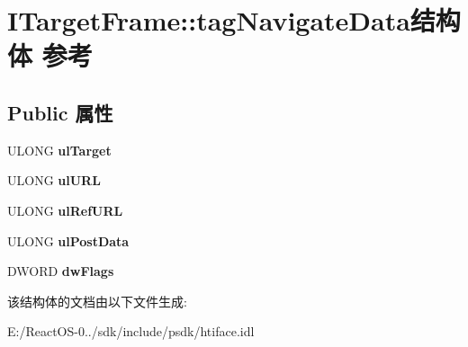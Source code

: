 \hypertarget{struct_i_target_frame_1_1tag_navigate_data}{}\section{I\+Target\+Frame\+:\+:tag\+Navigate\+Data结构体 参考}
\label{struct_i_target_frame_1_1tag_navigate_data}
\subsection*{Public 属性}
\begin{DoxyCompactItemize}
\item 
\mbox{\label{struct_i_target_frame_1_1tag_navigate_data_a6bf30644d53265e6566ba559ad3ac467}} 
U\+L\+O\+NG {\bfseries ul\+Target}
\item 
\mbox{\label{struct_i_target_frame_1_1tag_navigate_data_a969f78fed65c13a7c125ab4b8efbfa29}} 
U\+L\+O\+NG {\bfseries ul\+U\+RL}
\item 
\mbox{\label{struct_i_target_frame_1_1tag_navigate_data_adc81b193279c91fb4442cb2fde2ea7e4}} 
U\+L\+O\+NG {\bfseries ul\+Ref\+U\+RL}
\item 
\mbox{\label{struct_i_target_frame_1_1tag_navigate_data_a370b46f4957dd6625ee2cb2afd8da9c5}} 
U\+L\+O\+NG {\bfseries ul\+Post\+Data}
\item 
\mbox{\label{struct_i_target_frame_1_1tag_navigate_data_adb2deaeae96aa7bbedd604989c7b4b62}} 
D\+W\+O\+RD {\bfseries dw\+Flags}
\end{DoxyCompactItemize}


该结构体的文档由以下文件生成\+:\begin{DoxyCompactItemize}
\item 
E\+:/\+React\+O\+S-\/0../sdk/include/psdk/htiface.\+idl\end{DoxyCompactItemize}
